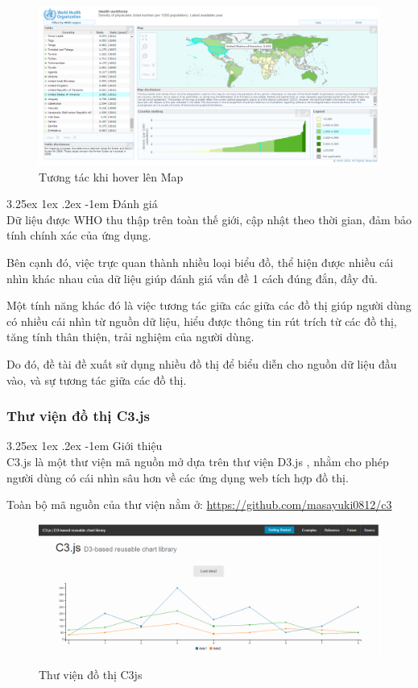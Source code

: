 \documentclass[12pt,a4paper]{article}
\makeatletter
\newcommand{\myparagraph}[1]{\paragraph{#1}\mbox{}\\} %
\renewcommand\paragraph{\@startsection{paragraph}{5}{\z@}%
  {3.25ex \@plus1ex \@minus.2ex}%
  {-1em}%
  {\normalfont\normalsize\bfseries}}
\makeatother
\begin{document}
\begin{figure}[htp]
    \begin{center}
    \includegraphics[scale=.4]{image/hoveratlas}
    \caption{Tương tác khi hover lên Map}
    \label{fig:hoveratlas}
    \end{center}
\end{figure}

\myparagraph{Đánh giá}
Dữ liệu được WHO thu thập trên toàn thế giới, cập nhật theo thời gian, đảm bảo tính chính xác của ứng dụng.

Bên cạnh đó, việc trực quan thành nhiều loại biểu đồ, thể hiện được nhiều cái nhìn khác nhau của dữ liệu giúp đánh giá vấn đề 1 cách đúng đắn, đầy đủ.

Một tính năng khác đó là việc tương tác giữa các giữa các đồ thị giúp người dùng có nhiều cái nhìn từ nguồn dữ liệu, hiểu được thông tin rút trích từ các đồ thị, tăng tính thân thiện, trải nghiệm của người dùng.

Do đó, đề tài đề xuất sử dụng nhiều đồ thị để biểu diễn cho nguồn dữ liệu đầu vào, và sự tương tác giữa các đồ thị.
\subsubsection{Thư viện đồ thị C3.js}
\myparagraph{Giới thiệu}
C3.js là một thư viện mã nguồn mở \cite{c3js} dựa trên thư viện D3.js , nhằm cho phép người dùng có cái nhìn sâu hơn về các ứng dụng web tích hợp đồ thị.

Toàn bộ mã nguồn của thư viện nằm ở: \url{https://github.com/masayuki0812/c3}
\begin{figure}[htp]
	\begin{center}
    \includegraphics[scale=.4]{image/c3js}
    \caption{Thư viện đồ thị C3js}
    \label{fig:c3js}
	\end{center}
\end{figure}
\end{document}
